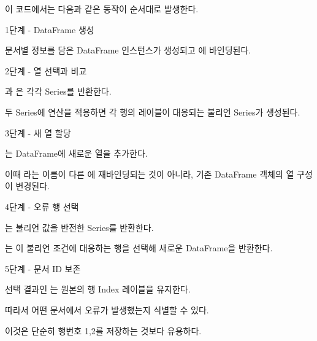 이 코드에서는 다음과 같은 동작이 순서대로 발생한다.

\begin{dhknote}
\begin{dhksmry}[centered]
1단계 - DataFrame 생성
\end{dhksmry}
\end{dhknote}

문서별 정보를 담은 DataFrame 인스턴스가 생성되고 에 바인딩된다.

\begin{dhknote}
\begin{dhksmry}[centered]
2단계 - 열 선택과 비교
\end{dhksmry}
\end{dhknote}

과 은 각각 Series를 반환한다.

두 Series에 \zsh{==} 연산을 적용하면 각 행의 레이블이 대응되는 불리언 Series가 생성된다.

\begin{dhknote}
\begin{dhksmry}[centered]
3단계 - 새 열 할당
\end{dhksmry}
\end{dhknote}

는 DataFrame에 새로운 열을 추가한다.

이때 라는 이름이 다른 에 재바인딩되는 것이 아니라, 기존 DataFrame 객체의 열 구성이 변경된다.

\begin{dhknote}
\begin{dhksmry}[centered]
4단계 - 오류 행 선택
\end{dhksmry}
\end{dhknote}

는 불리언 값을 반전한 Series를 반환한다.

는 이 불리언 조건에 대응하는 행을 선택해 새로운 DataFrame을 반환한다.

\begin{dhknote}
\begin{dhksmry}[centered]
5단계 - 문서 ID 보존
\end{dhksmry}
\end{dhknote}

선택 결과인 는 원본의 행 Index 레이블을 유지한다.

따라서 어떤 문서에서 오류가 발생했는지 식별할 수 있다.

이것은 단순히 행번호 1,2를 저장하는 것보다 유용하다.

